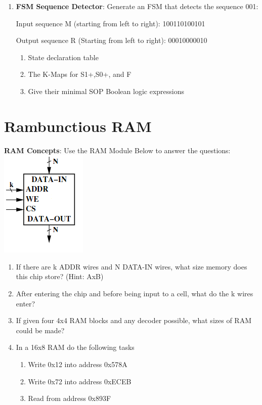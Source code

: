 \documentclass{article}
\begin{document}
\begin{enumerate}[label=(\alph*)]
    \item \textbf{FSM Sequence Detector}: Generate an FSM that detects the sequence 001: 
    
    Input sequence M (starting from left to right):  100110100101  
    
    Output sequence R (Starting from left to right):  00010000010

    \begin{enumerate}[label=(\roman*),nolistsep,itemsep = 60pt]
        \item State declaration table
        \item The K-Maps for S1+,S0+, and F
        \item Give their minimal SOP Boolean logic expressions
    
    \end{enumerate}

\end{enumerate}

\newpage
\section{Rambunctious RAM}
    \textbf{RAM Concepts}: Use the RAM Module Below to answer the questions:
    \newline
    \includegraphics{figures/RAM.png}
    \begin{enumerate}[label=(\alph*),itemsep = 10pt]
        \item If there are k ADDR wires and N DATA-IN wires, what size memory does this chip store? (Hint: AxB)
        \item After entering the chip and before being input to a cell, what do the k wires enter?
        \item If given four 4x4 RAM blocks and any decoder possible, what sizes of RAM could be made?
        \item In a 16x8 RAM do the following tasks
        \begin{enumerate}[label=(\roman*),itemsep = 10pt]
            \item Write 0x12 into address 0x578A
            \item Write 0x72 into address 0xECEB
            \item Read from address 0x893F
        \end{enumerate}
    \end{enumerate}
\end{document}
